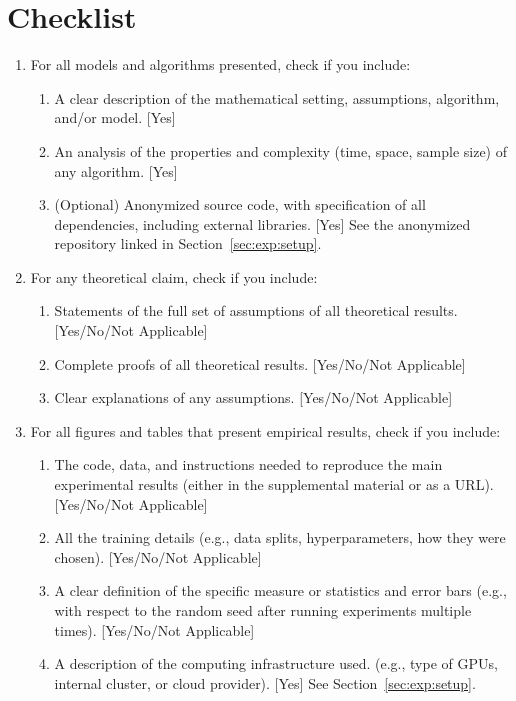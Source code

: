 \documentclass[twoside]{article}
\begin{document}
\section*{Checklist}

\begin{enumerate}

  \item For all models and algorithms presented, check if you include:
  \begin{enumerate}
    \item A clear description of the mathematical setting, assumptions, algorithm, and/or model. [Yes]
    \item An analysis of the properties and complexity (time, space, sample size) of any algorithm. [Yes]
    \item (Optional) Anonymized source code, with specification of all dependencies, including external libraries. [Yes] See the anonymized repository linked in
    Section~\ref{sec:exp:setup}.
  \end{enumerate}

  \item For any theoretical claim, check if you include:
  \begin{enumerate}
    \item Statements of the full set of assumptions of all theoretical results. [Yes/No/Not Applicable]
    \item Complete proofs of all theoretical results. [Yes/No/Not Applicable]
    \item Clear explanations of any assumptions. [Yes/No/Not Applicable]
  \end{enumerate}

  \item For all figures and tables that present empirical results, check if you include:
  \begin{enumerate}
    \item The code, data, and instructions needed to reproduce the main experimental results (either in the supplemental material or as a URL). [Yes/No/Not Applicable]
    \item All the training details (e.g., data splits, hyperparameters, how they were chosen). [Yes/No/Not Applicable]
    \item A clear definition of the specific measure or statistics and error bars (e.g., with respect to the random seed after running experiments multiple times). [Yes/No/Not Applicable]
    \item A description of the computing infrastructure used. (e.g., type of GPUs, internal cluster, or cloud provider). [Yes] See
    Section~\ref{sec:exp:setup}.
  \end{enumerate}


\end{enumerate}
\end{document}
